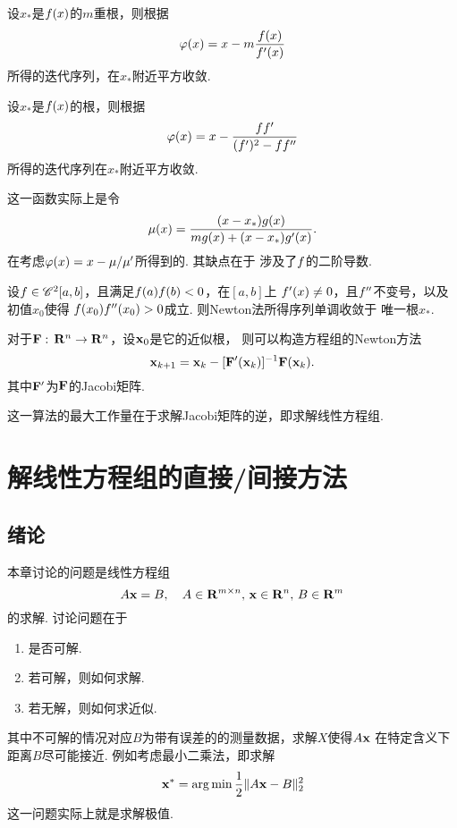   \begin{thm}[重根情况的Newton法]
    设$x_*$是$\mathnormal{f}(x)$的$m$重根，则根据
    \[
      \varphi(x) = x - m \frac{\mathnormal{f}(x)}{\mathnormal{f}^\prime(x)}
    \]
    所得的迭代序列，在$x_*$附近平方收敛.
  \end{thm}

  \begin{thm}[重根情况的Newton法]
    设$x_*$是$\mathnormal{f}(x)$的根，则根据
    \[
      \varphi(x) = x - \frac{\mathnormal{f}\mathnormal{f}^\prime}{(\mathnormal{f}^\prime)^2 - \mathnormal{f}\mathnormal{f}^{\prime\prime}}
    \]
    所得的迭代序列在$x_*$附近平方收敛.
  \end{thm}
  \remark
    这一函数实际上是令
    \[
      \mu(x) = \frac{(x-x_*)\mathnormal{g}(x)}{m\mathnormal{g}(x) + (x-x_*)\mathnormal{g}^\prime(x)}.
    \]
    在考虑$\varphi(x) = x - \mu/\mu^\prime$所得到的. 其缺点在于
    涉及了$\mathnormal{f}$的二阶导数.

  \begin{thm}[Newton法的收敛区间]
    设$\mathnormal{f}\in\mathscr{C}^2[a, b]$，且满足$\mathnormal{f}(a)\mathnormal{f}(b)<0$，在$[a, b]$上
    $\mathnormal{f}^\prime(x)\ne 0$，且$\mathnormal{f}^{\prime\prime}$不变号，以及初值$x_0$使得
    $\mathnormal{f}(x_0)\mathnormal{f}^{\prime\prime}(x_0)>0$成立. 则Newton法所得序列单调收敛于
    唯一根$x_*$.
  \end{thm}

  \begin{pos}[方程组情况的推广]
    对于$\mathbf{F}:\,\mathbf{R}^n\to\mathbf{R}^n$，设$\mathbf{x}_0$是它的近似根，
    则可以构造方程组的Newton方法
    \[
      \mathbf{x}_{k+1} = \mathbf{x}_k - [\mathbf{F}^\prime(\mathbf{x}_k)]^{-1}\mathbf{F}(\mathbf{x}_k).
    \]
    其中$\mathbf{F}^\prime$为$\mathbf{F}$的Jacobi矩阵.
  \end{pos}
  \remark
    这一算法的最大工作量在于求解Jacobi矩阵的逆，即求解线性方程组.

\newpage
\section{解线性方程组的直接/间接方法}
\subsection{绪论}
  本章讨论的问题是线性方程组
  \begin{equation}
    \label{equ: 线性方程组}
    A\mathbf{x} = B,\quad A\in\mathbf{R}^{m\times n},\,\mathbf{x}\in\mathbf{R}^n,\,B\in\mathbf{R}^m
  \end{equation}
  的求解. 讨论问题在于
  \begin{enumerate}
    \item {}是否可解.
    \item 若可解，则如何求解.
    \item 若无解，则如何求近似.
  \end{enumerate}
  其中不可解的情况对应$B$为带有误差的的测量数据，求解$X$使得$A\mathbf{x}$
  在特定含义下距离$B$尽可能接近. 例如考虑最小二乘法，即求解
  \begin{equation}
    \label{equ: 最小二乘法}
    \mathbf{x}^* = \operatorname*{arg\,min} \frac{1}{2}\|A\mathbf{x}-B\|^2_2
  \end{equation}
  这一问题实际上就是求解极值.

